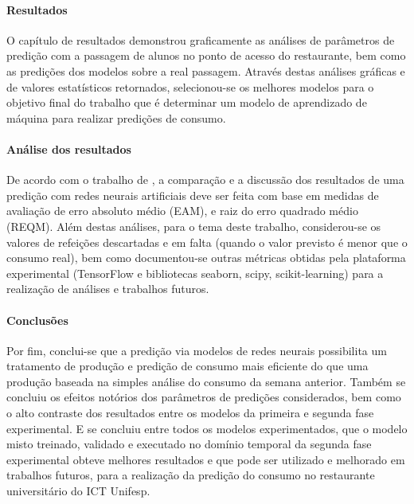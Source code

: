 \documentclass[	12pt, Times, openright, twoside, a4paper, english, brazil]{abntex2}
\begin{document}
        \paragraph{Resultados} %
            O capítulo de resultados demonstrou graficamente as análises de parâmetros de predição com a passagem de alunos no ponto de acesso do restaurante, bem como as predições dos modelos sobre a real passagem.
            Através destas análises gráficas e de valores estatísticos retornados, selecionou-se os melhores modelos para o objetivo final do trabalho que é determinar um modelo de aprendizado de máquina para realizar predições de consumo.
        
        \paragraph{Análise dos resultados}
            De acordo com  o trabalho de \cite{Flavia2014}, a comparação e a discussão dos resultados de uma predição com redes neurais artificiais deve ser feita com base em medidas de avaliação de erro absoluto médio (EAM), e raiz do erro quadrado médio (REQM). 
            Além destas análises, para o tema deste trabalho, considerou-se os valores de refeições descartadas e em falta (quando o valor previsto é menor que o consumo real), bem como documentou-se outras métricas obtidas pela plataforma experimental (TensorFlow e bibliotecas seaborn, scipy, scikit-learning) para a realização de análises e trabalhos futuros.
        
        \paragraph{Conclusões}
            Por fim, conclui-se que a predição via modelos de redes neurais possibilita um tratamento de produção e predição de consumo mais eficiente do que uma produção baseada na simples análise do consumo da semana anterior. 
            Também se concluiu os efeitos notórios dos parâmetros de predições considerados, bem como o alto contraste dos resultados entre os modelos da primeira e segunda fase experimental.
            E se concluiu entre todos os modelos experimentados, que o modelo misto treinado, validado e executado no domínio temporal da segunda fase experimental obteve melhores resultados e que pode ser utilizado e melhorado em trabalhos futuros, para a realização da predição do consumo no restaurante universitário do ICT Unifesp.
            
\end{document}
